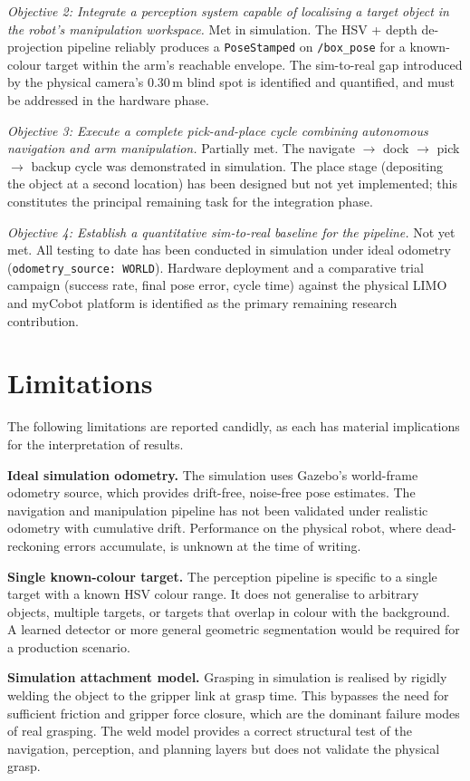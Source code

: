 \textit{Objective 2: Integrate a perception system capable of localising a target
object in the robot's manipulation workspace.}
Met in simulation. The HSV + depth de-projection pipeline reliably produces a
\texttt{PoseStamped} on \texttt{/box\_pose} for a known-colour target within the arm's
reachable envelope. The sim-to-real gap introduced by the physical camera's 0.30\,m
blind spot is identified and quantified, and must be addressed in the hardware phase.

\textit{Objective 3: Execute a complete pick-and-place cycle combining autonomous
navigation and arm manipulation.}
Partially met. The navigate $\to$ dock $\to$ pick $\to$ backup cycle was demonstrated
in simulation. The place stage (depositing the object at a second location) has been
designed but not yet implemented; this constitutes the principal remaining task for the
integration phase.

\textit{Objective 4: Establish a quantitative sim-to-real baseline for the pipeline.}
Not yet met. All testing to date has been conducted in simulation under ideal odometry
(\texttt{odometry\_source: WORLD}). Hardware deployment and a comparative trial campaign
(success rate, final pose error, cycle time) against the physical LIMO and myCobot
platform is identified as the primary remaining research contribution.

\section{Limitations}
The following limitations are reported candidly, as each has material implications for
the interpretation of results.

\textbf{Ideal simulation odometry.} The simulation uses Gazebo's world-frame odometry
source, which provides drift-free, noise-free pose estimates. The navigation and
manipulation pipeline has not been validated under realistic odometry with cumulative
drift. Performance on the physical robot, where dead-reckoning errors accumulate, is
unknown at the time of writing.

\textbf{Single known-colour target.} The perception pipeline is specific to a single
target with a known HSV colour range. It does not generalise to arbitrary objects,
multiple targets, or targets that overlap in colour with the background. A learned
detector or more general geometric segmentation would be required for a production
scenario.

\textbf{Simulation attachment model.} Grasping in simulation is realised by rigidly
welding the object to the gripper link at grasp time. This bypasses the need for
sufficient friction and gripper force closure, which are the dominant failure modes of
real grasping. The weld model provides a correct structural test of the navigation,
perception, and planning layers but does not validate the physical grasp.

